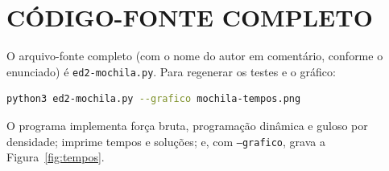 \documentclass[
    12pt,
    oneside,
    a4paper,
    chapter=TITLE,
    section=TITLE,
    sumario=abnt-6027-2012
]{abntex2}
\begin{document}
\apendices

\chapter{CÓDIGO-FONTE COMPLETO}
\label{ap:codigo}

O arquivo-fonte completo (com o nome do autor em comentário, conforme o enunciado) é \texttt{ed2-mochila.py}. Para regenerar os testes e o gráfico:

\begin{lstlisting}[language=bash]
python3 ed2-mochila.py --grafico mochila-tempos.png
\end{lstlisting}

O programa implementa força bruta, programação dinâmica e guloso por densidade; imprime tempos e soluções; e, com \texttt{--grafico}, grava a Figura~\ref{fig:tempos}.

\postextual

\end{document}

